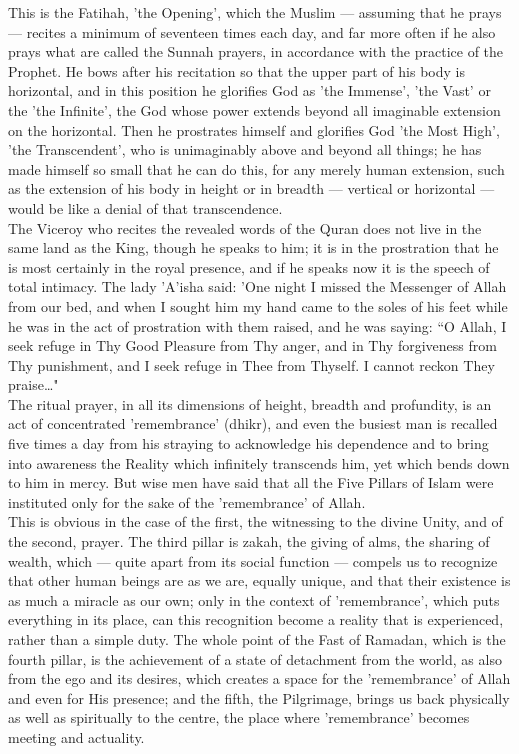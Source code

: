 \documentclass[10pt, twoside,openright]{book}
\begin{document}
This is the Fatihah, 'the Opening', which the Muslim --- assuming that he prays --- recites a minimum of 
seventeen times each day, and far more often if he also prays what are called the Sunnah prayers, in 
accordance with the practice of the Prophet. He bows after his recitation so that the upper part of 
his body is horizontal, and in this position he glorifies God as 'the Immense', 'the Vast' or the 
'the Infinite', the God whose power extends beyond all imaginable extension on the horizontal. Then 
he prostrates himself and glorifies God 'the Most High', 'the Transcendent', who is unimaginably 
above and beyond all things; he has made himself so small that he can do this, for any merely human 
extension, such as the extension of his body in height or in breadth --- vertical or horizontal --- would 
be like a denial of that transcendence. \\

The Viceroy who recites the revealed words of the Quran does not live in the same land as the King, 
though he speaks to him; it is in the prostration that he is most certainly in the royal presence, 
and if he speaks now it is the speech of total intimacy. The lady 'A'isha said: 'One night I missed 
the Messenger of Allah from our bed, and when I sought him my hand came to the soles of his feet 
while he was in the act of prostration with them raised, and he was saying: ``O Allah, I seek refuge 
in Thy Good Pleasure from Thy anger, and in Thy forgiveness from Thy punishment, and I seek refuge in 
Thee from Thyself. I cannot reckon They praise\ldots{}" \\

The ritual prayer, in all its dimensions of height, breadth and profundity, is an act of concentrated 
'remembrance' (dhikr), and even the busiest man is recalled five times a day from his straying to 
acknowledge his dependence and to bring into awareness the Reality which infinitely transcends him, 
yet which bends down to him in mercy. But wise men have said that all the Five Pillars of Islam were 
instituted only for the sake of the 'remembrance' of Allah. \\

This is obvious in the case of the first, the witnessing to the divine Unity, and of the second, 
prayer. The third pillar is zakah, the giving of alms, the sharing of wealth, which --- quite apart 
from its social function --- compels us to recognize that other human beings are as we are, equally 
unique, and that their existence is as much a miracle as our own; only in the context of 
'remembrance', which puts everything in its place, can this recognition become a reality that is 
experienced, rather than a simple duty. The whole point of the Fast of Ramadan, which is the fourth 
pillar, is the achievement of a state of detachment from the world, as also from the ego and its 
desires, which creates a space for the 'remembrance' of Allah and even for His presence; and the 
fifth, the Pilgrimage, brings us back physically as well as spiritually to the centre, the place 
where 'remembrance' becomes meeting and actuality. \\
\end{document}
